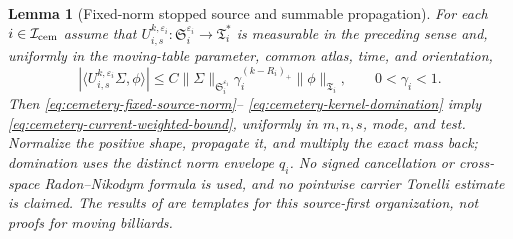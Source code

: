 \documentclass[11pt]{article}
\newtheorem{lemma}[theorem]{Lemma}
\begin{document}
\begin{lemma}[Fixed-norm stopped source and summable propagation]
\label{lem:stopped-source-propagation}
For each $i\in\mathcal I_{\rm cem}$ assume that
$U_{i,s}^{k,\varepsilon_i}:\mathfrak S_i^{\varepsilon_i}\to
\mathfrak T_i^*$ is measurable in the preceding sense and, uniformly in the
moving-table parameter, common atlas, time, and orientation,
\begin{equation}
\label{eq:stopped-source-propagation}
 |\langle U_{i,s}^{k,\varepsilon_i}\Sigma,\phi\rangle|
 \le C\|\Sigma\|_{\mathfrak S_i^{\varepsilon_i}}
       \gamma_i^{(k-R_i)_+}\|\phi\|_{\mathfrak T_i},
 \qquad 0<\gamma_i<1.
\end{equation}
Then \eqref{eq:cemetery-fixed-source-norm}--
\eqref{eq:cemetery-kernel-domination} imply
\eqref{eq:cemetery-current-weighted-bound}, uniformly in $m,n,s$, mode, and
test.  Normalize the positive shape, propagate it, and multiply the exact
mass back; domination uses the distinct norm envelope $q_i$.  No signed
cancellation or cross-space Radon--Nikodym formula is
used, and no pointwise carrier Tonelli estimate is claimed.  The results of
\cite{CanestrariPerturb,CanestrariHoles} are templates
for this source-first organization, not proofs for moving billiards.
\end{lemma}
\end{document}
